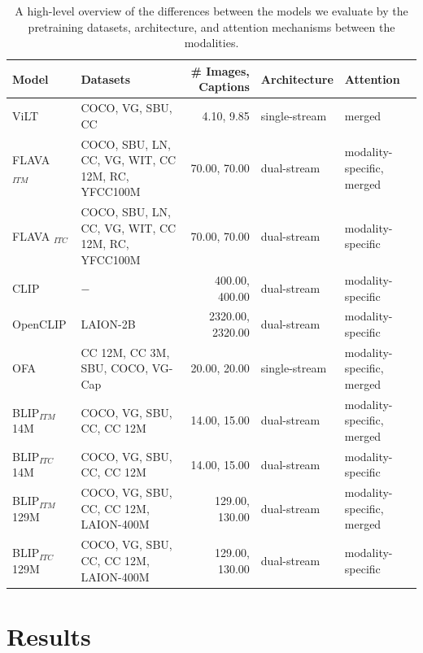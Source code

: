 \begin{table}[ht]
    \centering
    \small
    \begin{adjustbox}{max width=\textwidth}
    \begin{tabular}{l|lr|l|l}
    \toprule
    Model & Datasets & \# Images, Captions & Architecture & Attention \\\midrule
    ViLT \cite{kim2021vilt}  & COCO, VG, SBU, CC & 4.10, 9.85 & single-stream  & merged \\
    FLAVA $_{ITM}$ \cite{singh2022flava}  & COCO, SBU, LN, CC, VG, WIT, CC 12M, RC, YFCC100M & 70.00, 70.00 & dual-stream & modality-specific, merged \\
    FLAVA $_{ITC}$ \cite{singh2022flava}  & COCO, SBU, LN, CC, VG, WIT, CC 12M, RC, YFCC100M & 70.00, 70.00 & dual-stream & modality-specific \\
    CLIP \cite{radford2021clip}  & $-$ & 400.00, 400.00 & dual-stream & modality-specific \\
    OpenCLIP \cite{ilharco_gabriel_2021_5143773}  & LAION-2B & 2320.00, 2320.00 & dual-stream & modality-specific \\
    OFA \cite{wang2022unifying} &  CC 12M, CC 3M, SBU, COCO, VG-Cap  &  20.00, 20.00 &   single-stream & modality-specific, merged \\
    BLIP$_{ITM}$ 14M \cite{li2022blip} &  COCO, VG, SBU, CC, CC 12M  &  14.00, 15.00 &   dual-stream & modality-specific, merged \\
    BLIP$_{ITC}$ 14M \cite{li2022blip} &  COCO, VG, SBU, CC, CC 12M & 14.00, 15.00 &   dual-stream &         modality-specific \\
    BLIP$_{ITM}$ 129M \cite{li2022blip} & COCO, VG, SBU, CC, CC 12M, LAION-400M & 129.00,   130.00 &   dual-stream & modality-specific, merged \\
    BLIP$_{ITC}$ 129M \cite{li2022blip} & COCO, VG, SBU, CC, CC 12M, LAION-400M & 129.00,   130.00 &   dual-stream &         modality-specific \\
    \bottomrule
    \end{tabular}
    \end{adjustbox}
    \caption{A high-level overview of the differences between the models we evaluate by the pretraining datasets, architecture, and attention mechanisms between the modalities.}
    \label{tab:model-types-ours}
\end{table}
\fi

\section{Results} \label{sec:winoground_results}

